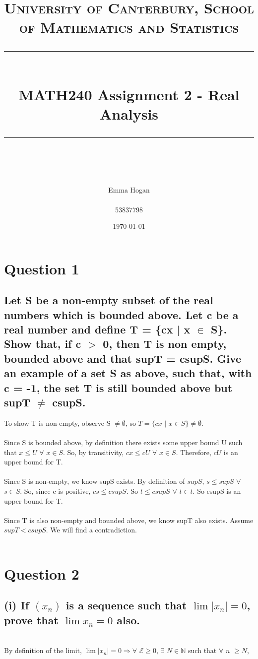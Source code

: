 \documentclass{article}
\title{	
	\normalfont\normalsize
	\textsc{University of Canterbury, School of Mathematics and Statistics}\\ %
	\vspace{25pt} %
	\rule{\linewidth}{0.5pt}\\ %
	\vspace{20pt} %
	{\huge MATH240 Assignment 2 - Real Analysis}\\ %
	\vspace{12pt} %
	\rule{\linewidth}{2pt}\\ %
	\vspace{12pt} %
}
\author{\LARGE Emma Hogan \\\\53837798} %
\date{\normalsize\today} %
\begin{document}
\begin{titlepage}
\maketitle
\end{titlepage}
\section*{Question 1}
\subsection*{Let S be a non-empty subset of the real numbers which is bounded above. Let c be a real number and define T = \{cx $\mid$ x $\in$ S\}. Show that, if c $>$ 0, then T is non empty, bounded above and that supT = csupS. Give an example of a set S as above, such that, with c = -1, the set T is still bounded above but supT $\ne$ csupS.}

\solution
To show T is non-empty, observe S \(\neq \emptyset\), so \(T = \{cx\) \(|\) \(x \in S\} \neq \emptyset\).
\\
\\
Since S is bounded above, by definition there exists some upper bound U such that \(x \leq U\) \(\forall\) \(x \in S\). So, by transitivity, \(cx \leq cU\) \(\forall\) \(x \in S\). Therefore, \(cU\) is an upper bound for T.
\\
\\
Since S is non-empty, we know supS exists. By definition of \(supS\), \(s \leq supS\) \(\forall\) \(s \in S\). So, since c is positive, \(cs \leq csupS\). So \(t \leq csupS\) \(\forall\) \(t \in t\). So csupS is an upper bound for T.
\\
\\
Since T is also non-empty and bounded above, we know supT also exists. Assume \(supT < csupS\). We will find a contradiction.
\\
\\


\section*{Question 2}
\subsection*{(i) If \((x_n)\) is a sequence such that \(\lim|x_n| = 0\), prove that \(\lim x_n = 0\) also.}

\solution
\\
By definition of the limit, \(\lim|x_n| = 0 \Rightarrow \forall\) \(\mathcal{E} \geq 0\), \(\exists\) \(N \in \mathds{N}\) such that \(\forall\) \(n\) \(\geq N\),
\end{document}
